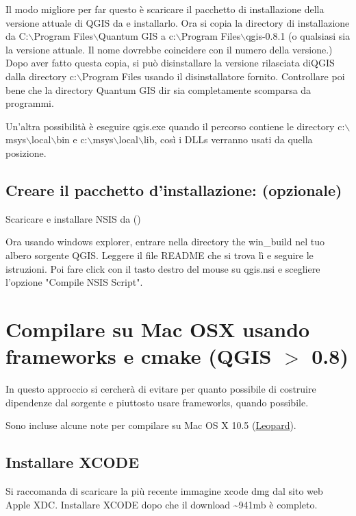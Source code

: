 Il modo migliore per far questo è scaricare il pacchetto di installazione della versione attuale di QGIS da  e installarlo. Ora si copia la directory di installazione da C:$\backslash$Program Files$\backslash$Quantum GIS a c:$\backslash$Program
Files$\backslash$qgis-0.8.1 (o qualsiasi sia la versione attuale. Il nome dovrebbe coincidere con il numero della versione.) Dopo aver fatto questa copia, si può disinstallare la versione rilasciata diQGIS dalla directory c:$\backslash$Program Files usando il disinstallatore fornito. Controllare poi bene che la directory Quantum GIS dir sia completamente scomparsa da programmi.

Un'altra possibilità è eseguire qgis.exe quando il percorso contiene le directory
c:$\backslash$msys$\backslash$local$\backslash$bin e c:$\backslash$msys$\backslash$local$\backslash$lib, così i DLLs verranno usati da quella posizione.

\subsection{Creare il pacchetto d'installazione: (opzionale)}
Scaricare e installare NSIS da ()

Ora usando windows explorer, entrare nella directory the win\_build nel tuo albero sorgente QGIS. Leggere il file README che si trova lì e seguire le istruzioni. Poi fare click con il tasto destro del mouse su qgis.nsi e scegliere l'opzione "Compile NSIS Script".


\section{Compilare su Mac OSX usando frameworks e cmake (QGIS $>$ 0.8)}\label{sec:install_macosx}
In questo approccio si cercherà di evitare per quanto possibile di costruire dipendenze dal sorgente e piuttosto usare frameworks, quando possibile.

Sono incluse alcune note per compilare su Mac OS X 10.5 (\underline{Leopard}).

\subsection{Installare XCODE}
Si raccomanda di scaricare la più recente immagine xcode dmg dal sito web Apple XDC. Installare XCODE dopo che il download \~{}941mb è completo.

